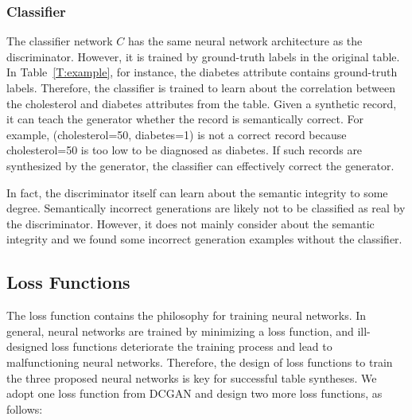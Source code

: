 

\subsubsection{Classifier}\label{sec:class}
The classifier network $C$ has the same neural network architecture as the discriminator. However, it is trained by ground-truth labels in the original table. In Table~\ref{T:example}, for instance, the diabetes attribute contains ground-truth labels. Therefore, the classifier is trained to learn about the correlation between the cholesterol and diabetes attributes from the table. Given a synthetic record, it can teach the generator whether the record is semantically correct. For example, (cholesterol=50, diabetes=1) is not a correct record because cholesterol=50 is too low to be diagnosed as diabetes. If such records are synthesized by the generator, the classifier can effectively correct the generator.

In fact, the discriminator itself can learn about the semantic integrity to some degree. Semantically incorrect generations are likely not to be classified as real by the discriminator. However, it does not mainly consider about the semantic integrity and we found some incorrect generation examples without the classifier.


\subsection{Loss Functions}
The loss function contains the philosophy for training neural networks. In general, neural networks are trained by minimizing a loss function, and ill-designed loss functions deteriorate the training process and lead to malfunctioning neural networks. Therefore, the design of loss functions to train the three proposed neural networks is key for successful table syntheses. We adopt one loss function from DCGAN and design two more loss functions, as follows:

